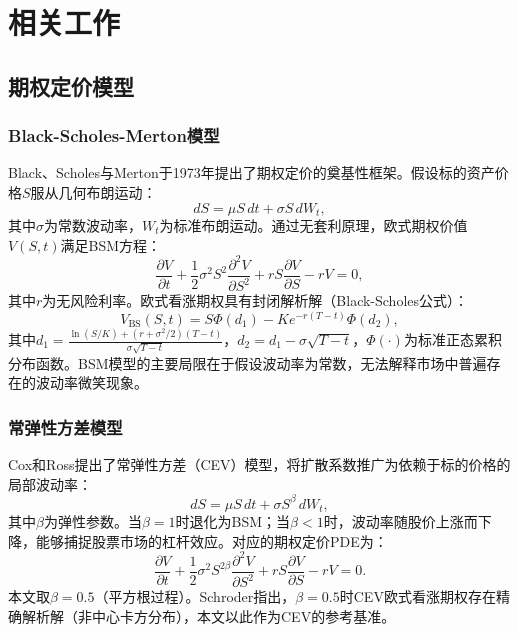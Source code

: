\chapter{相关工作}\label{chap:related}

\section{期权定价模型}\label{sec:option_models}

\subsection{Black-Scholes-Merton模型}

Black、Scholes与Merton于1973年提出了期权定价的奠基性框架\cite{black1973pricing,merton1973theory}。假设标的资产价格$S$服从几何布朗运动：
\begin{equation}
  dS = \mu S\,dt + \sigma S\,dW_t,
\end{equation}
其中$\sigma$为常数波动率，$W_t$为标准布朗运动。通过无套利原理，欧式期权价值$V(S,t)$满足BSM方程：
\begin{equation}\label{eq:bsm}
  \frac{\partial V}{\partial t}
  + \frac{1}{2}\sigma^2 S^2 \frac{\partial^2 V}{\partial S^2}
  + rS\frac{\partial V}{\partial S}
  - rV = 0,
\end{equation}
其中$r$为无风险利率。欧式看涨期权具有封闭解析解（Black-Scholes公式）：
\begin{equation}\label{eq:bs_formula}
  V_\text{BS}(S,t) = S\Phi(d_1) - Ke^{-r(T-t)}\Phi(d_2),
\end{equation}
其中$d_1 = \frac{\ln(S/K)+(r+\sigma^2/2)(T-t)}{\sigma\sqrt{T-t}}$，$d_2=d_1-\sigma\sqrt{T-t}$，$\Phi(\cdot)$为标准正态累积分布函数。BSM模型的主要局限在于假设波动率为常数，无法解释市场中普遍存在的波动率微笑现象。

\subsection{常弹性方差模型}

Cox和Ross\cite{cox1976valuation}提出了常弹性方差（CEV）模型，将扩散系数推广为依赖于标的价格的局部波动率：
\begin{equation}
  dS = \mu S\,dt + \sigma S^{\beta}\,dW_t,
\end{equation}
其中$\beta$为弹性参数。当$\beta=1$时退化为BSM；当$\beta<1$时，波动率随股价上涨而下降，能够捕捉股票市场的杠杆效应。对应的期权定价PDE为：
\begin{equation}\label{eq:cev}
  \frac{\partial V}{\partial t}
  + \frac{1}{2}\sigma^2 S^{2\beta} \frac{\partial^2 V}{\partial S^2}
  + rS\frac{\partial V}{\partial S}
  - rV = 0.
\end{equation}
本文取$\beta=0.5$（平方根过程）。Schroder\cite{schroder1989computing}指出，$\beta=0.5$时CEV欧式看涨期权存在精确解析解（非中心卡方分布），本文以此作为CEV的参考基准。

